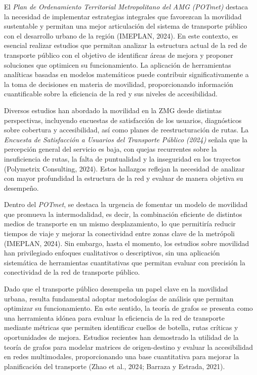 \documentclass[openany]{book}
\begin{document}
	El \textit{Plan de Ordenamiento Territorial Metropolitano del AMG (POTmet)} destaca la necesidad de implementar estrategias integrales que favorezcan la movilidad sustentable y permitan una mejor articulación del sistema de transporte público con el desarrollo urbano de la región (IMEPLAN, 2024). En este contexto, es esencial realizar estudios que permitan analizar la estructura actual de la red de transporte público con el objetivo de identificar áreas de mejora y proponer soluciones que optimicen su funcionamiento. La aplicación de herramientas analíticas basadas en modelos matemáticos puede contribuir significativamente a la toma de decisiones en materia de movilidad, proporcionando información cuantificable sobre la eficiencia de la red y sus niveles de accesibilidad.

	Diversos estudios han abordado la movilidad en la ZMG desde distintas perspectivas, incluyendo encuestas de satisfacción de los usuarios, diagnósticos sobre cobertura y accesibilidad, así como planes de reestructuración de rutas. La \textit{Encuesta de Satisfacción a Usuarios del Transporte Público (2024)} señala que la percepción general del servicio es baja, con quejas recurrentes sobre la insuficiencia de rutas, la falta de puntualidad y la inseguridad en los trayectos (Polymetrix Consulting, 2024). Estos hallazgos reflejan la necesidad de analizar con mayor profundidad la estructura de la red y evaluar de manera objetiva su desempeño.

	Dentro del \textit{POTmet}, se destaca la urgencia de fomentar un modelo de movilidad que promueva la intermodalidad, es decir, la combinación eficiente de distintos medios de transporte en un mismo desplazamiento, lo que permitiría reducir tiempos de viaje y mejorar la conectividad entre zonas clave de la metrópoli (IMEPLAN, 2024). Sin embargo, hasta el momento, los estudios sobre movilidad han privilegiado enfoques cualitativos o descriptivos, sin una aplicación sistemática de herramientas cuantitativas que permitan evaluar con precisión la conectividad de la red de transporte público.

	Dado que el transporte público desempeña un papel clave en la movilidad urbana, resulta fundamental adoptar metodologías de análisis que permitan optimizar su funcionamiento. En este sentido, la teoría de grafos se presenta como una herramienta idónea para evaluar la eficiencia de la red de transporte mediante métricas que permiten identificar cuellos de botella, rutas críticas y oportunidades de mejora. Estudios recientes han demostrado la utilidad de la teoría de grafos para modelar matrices de origen-destino y evaluar la accesibilidad en redes multimodales, proporcionando una base cuantitativa para mejorar la planificación del transporte (Zhao et al., 2024; Barraza y Estrada, 2021).
\end{document}

